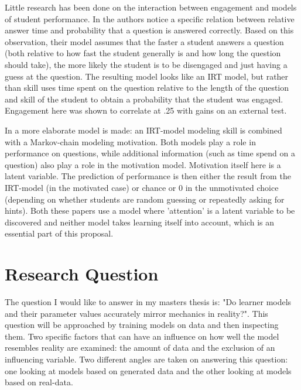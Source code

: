 \documentclass{article}
\begin{document}
Little research has been done on the interaction between engagement and models of student performance. In \cite{engagement} the authors notice a specific relation between relative answer time and probability that a question is answered correctly. Based on this observation, their model assumes that the faster a student answers a question (both relative to how fast the student generally is and how long the question should take), the more likely the student is to be disengaged and just having a guess at the question. The resulting model looks like an IRT model, but rather than skill uses time spent on the question relative to the length of the question and skill of the student to obtain a probability that the student was engaged. Engagement here was shown to correlate at .25 with gains on an external test.

In \cite{engageproficiency} a more elaborate model is made: an IRT-model modeling skill is combined with a Markov-chain modeling motivation. Both models play a role in performance on questions, while additional information (such as time spend on a question) also play a role in the motivation model. Motivation itself here is a latent variable. The prediction of performance is then either the result from the IRT-model (in the motivated case) or chance or 0 in the unmotivated choice (depending on whether students are random guessing or repeatedly asking for hints). Both these papers use a model where 'attention' is a latent variable to be discovered and neither model takes learning itself into account, which is an essential part of this proposal.

\section{Research Question}
\label{sec:RQ}
The question I would like to answer in my masters thesis is: "Do learner models and their parameter values accurately mirror mechanics in reality?". This question will be approached by training models on data and then inspecting them. Two specific factors that can have an influence on how well the model resembles reality are examined: the amount of data and the exclusion of an influencing variable. Two different angles are taken on answering this question: one looking at models based on generated data and the other looking at models based on real-data.
\end{document}
